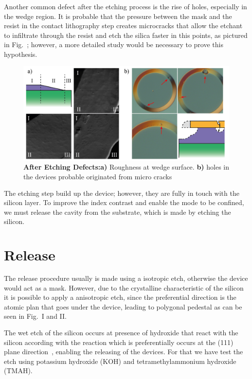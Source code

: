 Another common defect after the etching process is the rise of holes, especially in the wedge region. It is probable that the pressure between the mask and the resist in the contact lithography step creates microcracks that allow the etchant to infiltrate through the resist and etch the silica faster in this points, as pictured in Fig.~; however, a more detailed study would be necessary to prove this hypothesis. 

\begin{figure}[!ht]
    \centering
    \includegraphics[width = 16cm]{figuras/Dissertation_etchin_def.jpg}
    \caption{\textbf{After Etching Defects:a)} Roughness at wedge surface. \textbf{b)} holes in the devices probable originated from micro cracks}
    \label{fig:ethc_wrong}
\end{figure}

The etching step build up the device; however, they are fully in touch with the silicon layer. To improve the index contrast and enable the mode to be confined, we must release the cavity from the substrate, which is made by etching the silicon.

\section{Release}

The release procedure usually is made using a isotropic etch, otherwise the device would act as a mask. However, due to the crystalline characteristic of the silicon it is possible to apply a anisotropic etch, since the preferential direction is the atomic plan that goes under the device, leading to polygonal pedestal as can be seen in Fig.~I and II.

The wet etch of the silicon occurs at presence of hydroxide that react with the silicon according with the reaction
which is preferentially occurs at the (111) plane direction~\cite{Glembocki_1985}, enabling the releasing of the devices. For that we have test the etch using potassium hydroxide (KOH) and tetramethylammonium hydroxide (TMAH).

